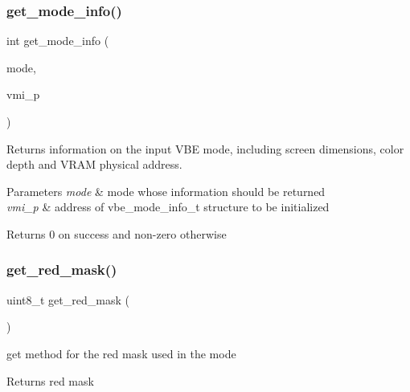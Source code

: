 \subsubsection{\texorpdfstring{get\+\_\+mode\+\_\+info()}{get\_mode\_info()}}
{\footnotesize\ttfamily int get\+\_\+mode\+\_\+info (\begin{DoxyParamCaption}\item[{uint16\+\_\+t}]{mode,  }\item[{vbe\+\_\+mode\+\_\+info\+\_\+t $\ast$}]{vmi\+\_\+p }\end{DoxyParamCaption})}



Returns information on the input V\+BE mode, including screen dimensions, color depth and V\+R\+AM physical address. 


\begin{DoxyParams}{Parameters}
{\em mode} & mode whose information should be returned \\
\hline
{\em vmi\+\_\+p} & address of vbe\+\_\+mode\+\_\+info\+\_\+t structure to be initialized\\
\hline
\end{DoxyParams}
\begin{DoxyReturn}{Returns}
0 on success and non-\/zero otherwise 
\end{DoxyReturn}
\mbox{\label{group__Video_ga98dfb26e764e6a19e51c2c6db282f982}} 
\subsubsection{\texorpdfstring{get\+\_\+red\+\_\+mask()}{get\_red\_mask()}}
{\footnotesize\ttfamily uint8\+\_\+t get\+\_\+red\+\_\+mask (\begin{DoxyParamCaption}{ }\end{DoxyParamCaption})}



get method for the red mask used in the mode 

\begin{DoxyReturn}{Returns}
red mask 
\end{DoxyReturn}
\mbox{\label{group__Video_gaefb95d930fabc3645326297ed5d37b63}} 
